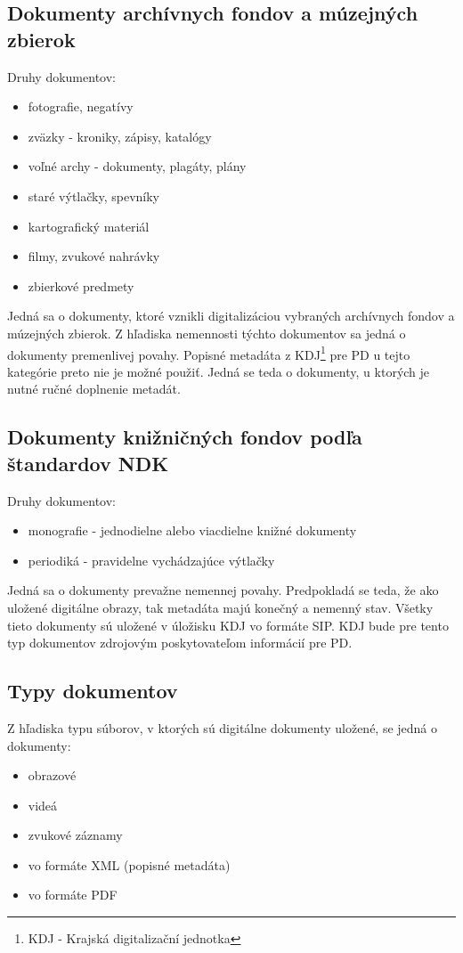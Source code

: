 \documentclass[
  print, %
  table,   %
  lof,     %
  nolot,     %
]{fithesis3}
\begin{document}
\subsection{Dokumenty archívnych fondov a múzejných zbierok}
Druhy dokumentov:
\begin{itemize}
	\item fotografie, negatívy				
	\item zväzky - kroniky, zápisy, katalógy
	\item voľné archy - dokumenty, plagáty, plány
	\item staré výtlačky, spevníky
	\item kartografický materiál 
	\item filmy, zvukové nahrávky 
	\item zbierkové predmety	
\end{itemize}
Jedná sa o dokumenty, ktoré vznikli digitalizáciou vybraných archívnych fondov a múzejných zbierok. Z hľadiska nemennosti týchto dokumentov sa jedná o dokumenty premenlivej povahy. Popisné metadáta z KDJ\footnote{KDJ - Krajská digitalizační jednotka} pre PD u tejto kategórie preto nie je možné použiť. Jedná se teda o dokumenty, u ktorých je nutné ručné doplnenie metadát. 

\subsection{Dokumenty knižničných fondov podľa štandardov NDK}
Druhy dokumentov:
\begin{itemize}
	\item monografie - jednodielne alebo viacdielne knižné dokumenty			
	\item periodiká - pravidelne vychádzajúce výtlačky
\end{itemize}
Jedná sa o dokumenty prevažne nemennej povahy. Predpokladá se teda, že ako uložené digitálne obrazy, tak metadáta majú konečný a nemenný stav. Všetky tieto dokumenty sú uložené v úložisku KDJ vo formáte SIP. KDJ bude pre tento typ dokumentov zdrojovým poskytovateľom informácií pre PD. 
\subsection{Typy dokumentov} 
Z hľadiska typu súborov, v ktorých sú digitálne dokumenty uložené, se jedná o dokumenty:
\begin{itemize}
	\item obrazové			
	\item videá
	\item zvukové záznamy
	\item vo formáte XML (popisné metadáta)		
	\item vo formáte PDF
\end{itemize}
\end{document}
